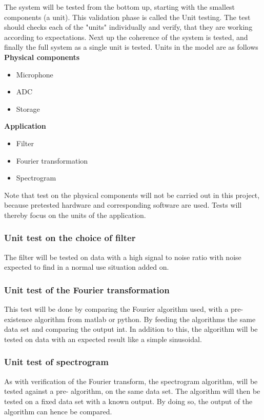 The system will be tested from the bottom up, starting with the smallest components (a unit). This validation phase is called the Unit testing. The test should checks each of the "units" individually and verify, that they are working according to expectations. Next up the coherence of the system is tested, and finally the full system as a single unit is tested. Units in the model are as follows \\
\textbf{Physical components }  
\begin{itemize}
	\item Microphone
	\item ADC
	\item Storage
\end{itemize}
\textbf{Application}
\begin{itemize}
	\item Filter
	\item Fourier transformation
	\item Spectrogram
\end{itemize}
Note that test on the physical components will not be carried out in this project, because pretested hardware and corresponding software are used. Tests will thereby focus on the units of the application.\\ 
\subsubsection{Unit test on the choice of filter}
The filter will be tested on data with a high signal to noise ratio with noise expected to find in a normal use situation added on.
\subsubsection{Unit test of the Fourier transformation}
This test will be done by comparing the Fourier algorithm used, with a pre-existence algorithm from matlab or python.
By feeding the algorithms the same data set and comparing the output int. 
In addition to this, the algorithm will be tested on data with an expected result like a simple sinusoidal.
\subsubsection{Unit test of spectrogram}
As with verification of the Fourier transform, the spectrogram algorithm, will be tested against a pre- algorithm, on the same data set.
The algorithm will then be tested on a fixed data set with a known output.
By doing so, the output of the algorithm can hence be compared.
